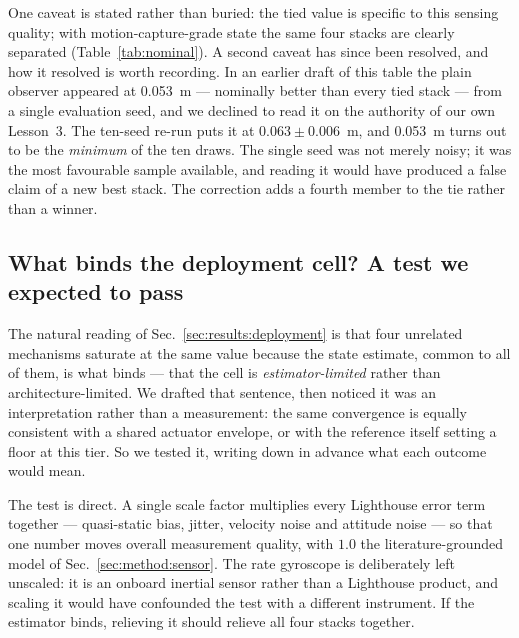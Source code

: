 One caveat is stated rather than buried: the tied value is specific to this sensing
quality; with motion-capture-grade state the same four stacks are clearly separated
(Table~\ref{tab:nominal}). A second caveat has since been resolved, and how it resolved
is worth recording. In an earlier draft of this table the plain observer appeared at
\SI{0.053}{\meter} --- nominally better than every tied stack --- from a single
evaluation seed, and we declined to read it on the authority of our own Lesson~3. The
ten-seed re-run puts it at $0.063\pm0.006$~\si{\meter}, and \SI{0.053}{\meter} turns out
to be the \emph{minimum} of the ten draws. The single seed was not merely noisy; it was
the most favourable sample available, and reading it would have produced a false claim of
a new best stack. The correction adds a fourth member to the tie rather than a winner.

\subsection{What binds the deployment cell? A test we expected to pass}
\label{sec:results:whatbinds}

The natural reading of Sec.~\ref{sec:results:deployment} is that four unrelated
mechanisms saturate at the same value because the state estimate, common to all of them,
is what binds --- that the cell is \emph{estimator-limited} rather than
architecture-limited. We drafted that sentence, then noticed it was an interpretation
rather than a measurement: the same convergence is equally consistent with a shared
actuator envelope, or with the reference itself setting a floor at this tier. So we
tested it, writing down in advance what each outcome would mean.

The test is direct. A single scale factor multiplies every Lighthouse error term
together --- quasi-static bias, jitter, velocity noise and attitude noise --- so that one
number moves overall measurement quality, with $1.0$ the literature-grounded model of
Sec.~\ref{sec:method:sensor}. The rate gyroscope is deliberately left unscaled: it is an
onboard inertial sensor rather than a Lighthouse product, and scaling it would have
confounded the test with a different instrument. If the estimator binds, relieving it
should relieve all four stacks together.

